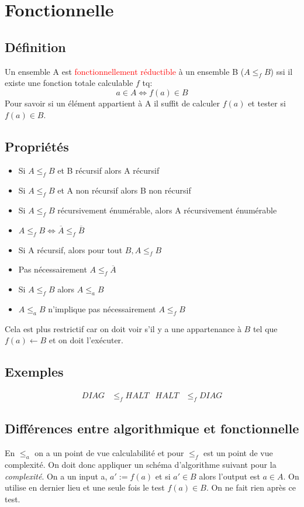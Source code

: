 \documentclass{report}
\begin{document}
\section{Fonctionnelle}
\subsection{Définition}
Un ensemble A est \textcolor{red}{fonctionnellement réductible} à un ensemble B ($A \leqslant_f B$) ssi il existe une fonction totale calculable $f$ tq:
\begin{equation}
a \in A \Leftrightarrow f(a) \in B
\end{equation}
Pour savoir si un élément appartient à A il suffit de calculer $f(a)$ et tester si $f(a) \in B$.

\subsection{Propriétés}
\begin{itemize}
\item Si $A \leqslant_f B$ et B récursif alors A récursif
\item Si $A \leqslant_f B$ et A non récursif alors B non récursif
\item Si $A \leqslant_f B$ récursivement énumérable, alors A récursivement énumérable
\item $A \leqslant_f B \Leftrightarrow \overline{A} \leqslant_f \overline{B}$
\item Si A récursif, alors pour tout $B,A \leqslant_f B$
\item Pas nécessairement $A \leqslant_f \overline{A}$
\item Si $A \leqslant_f B$ alors $A \leqslant_a B$
\item $A \leqslant_a B$ n'implique pas nécessairement $A \leqslant_f B$
\end{itemize}
Cela est plus restrictif car on doit voir s'il y a une appartenance à $B$ tel que $f(a) \leftarrow B$ et on doit l'exécuter.

\subsection{Exemples}
\begin{align*}
DIAG & \leqslant_f HALT & HALT &\leqslant_f DIAG
\end{align*}

\subsection{Différences entre algorithmique et fonctionnelle}
En $\leqslant_a$ on a un point de vue calculabilité et pour $\leqslant_f$ est un point de vue complexité. On doit donc appliquer un schéma d'algorithme suivant pour la \textit{complexité}. On a un input a, $a' := f(a)$ et si $a' \in B$ alors l'output est $a \in A$. On utilise en dernier lieu et une seule fois le test $f(a) \in B$. On ne fait rien après ce test.
\end{document}
